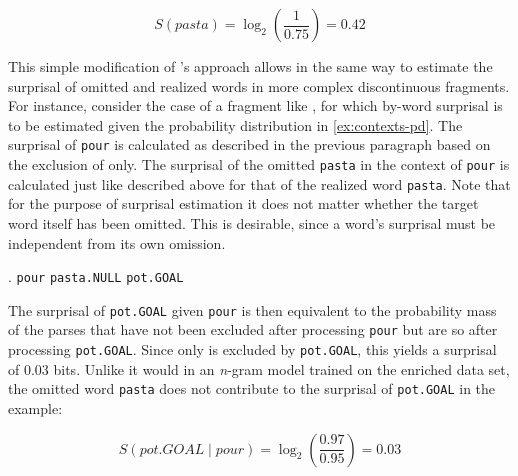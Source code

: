 \begin{equation}
S(pasta) = \log_2 (\frac{1}{0.75}) = 0.42 \label{eq:pasta-s}
\end{equation}

This simple modification of \citeauthor{hale2001}'s approach allows in the same way to estimate the surprisal of omitted and realized words in more complex discontinuous fragments. For instance, consider the case of a fragment like \Next, for which by-word surprisal is to be estimated given the probability distribution in \ref{ex:contexts-pd}. The surprisal of \texttt{pour} is calculated as described in the previous paragraph based on the exclusion of \LLast[c] only. The surprisal of the omitted \texttt{pasta} in the context of \texttt{pour} is calculated just like described above for that of the realized word \texttt{pasta}. Note that for the purpose of surprisal estimation it does not matter whether the target word itself has been omitted. This is desirable, since a word's surprisal must be independent from its own omission.

\ex. \texttt{pour} \texttt{pasta.NULL} \texttt{pot.GOAL}

The surprisal of \texttt{pot.GOAL} given \texttt{pour} is then equivalent to the probability mass of the parses that have not been excluded after processing \texttt{pour} but are so after processing \texttt{pot.GOAL}. Since only \Last[d] is excluded by \texttt{pot.GOAL}, this yields a surprisal of 0.03 bits. Unlike it would in an \textit{n}-gram model trained on the enriched data set, the omitted word \texttt{pasta} does not contribute to the surprisal of \texttt{pot.GOAL} in the example:

\begin{equation}
S(pot.GOAL\mathbin{|}pour) = \log_2(\frac{0.97}{0.95}) = 0.03
\end{equation}

